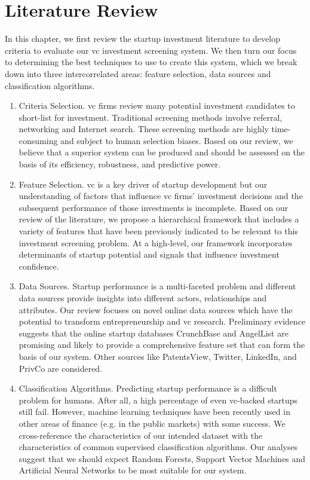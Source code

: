\documentclass[../thesis/thesis.tex]{subfiles}
\begin{document}
\chapter{Literature Review}
\label{chap:litreview}


In this chapter, we first review the startup investment literature to develop criteria to evaluate our \gls{vc} investment screening system. We then turn our focus to determining the best techniques to use to create this system, which we break down into three intercorrelated areas: feature selection, data sources and classification algorithms.

\begin{enumerate}

\item Criteria Selection. \Gls{vc} firms review many potential investment candidates to short-list for investment. Traditional screening methods involve referral, networking and Internet search. These screening methods are highly time-consuming and subject to human selection biases. Based on our review, we believe that a superior system can be produced and should be assessed on the basis of its efficiency, robustness, and predictive power.

\item Feature Selection. \Gls{vc} is a key driver of startup development but our understanding of factors that influence \gls{vc} firms' investment decisions and the subsequent performance of those investments is incomplete. Based on our review of the literature, we propose a hierarchical framework that includes a variety of features that have been previously indicated to be relevant to this investment screening problem. At a high-level, our framework incorporates determinants of startup potential and signals that influence investment confidence.

\item Data Sources. Startup performance is a multi-faceted problem and different data sources provide insights into different actors, relationships and attributes. Our review focuses on novel online data sources which have the potential to transform entrepreneurship and \gls{vc} research. Preliminary evidence suggests that the online startup databases CrunchBase and AngelList are promising and likely to provide a comprehensive feature set that can form the basis of our system. Other sources like PatentsView, Twitter, LinkedIn, and PrivCo are considered.

\item Classification Algorithms. Predicting startup performance is a difficult problem for humans. After all, a high percentage of even \gls{vc}-backed startups still fail. However, machine learning techniques have been recently used in other areas of finance (e.g. in the public markets) with some success. We cross-reference the characteristics of our intended dataset with the characteristics of common supervised classification algorithms. Our analyses suggest that we should expect Random Forests, Support Vector Machines and Artificial Neural Networks to be most suitable for our system.

\end{enumerate}
\end{document}
